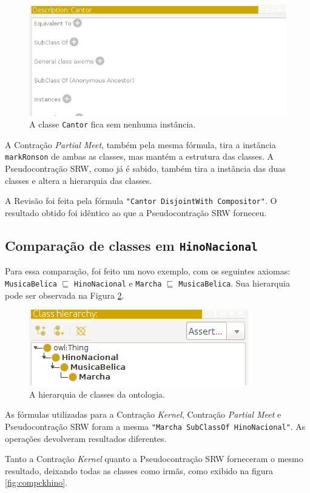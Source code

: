\begin{figure}[H]
	\centering
	\includegraphics[width=0.5\linewidth]{Capitulos/Testes/compckcantor3}
	\caption{A classe \texttt{Cantor} fica sem nenhuma instância.}
	\label{fig:compckcantor3}
\end{figure}

A Contração \textit{Partial Meet}, também pela mesma fórmula, tira a instância \texttt{markRonson} de ambas as classes, mas mantém a estrutura das classes. A Pseudocontração SRW, como já é sabido, também tira a instância das duas classes e altera a hierarquia das classes.

A Revisão foi feita pela fórmula \texttt{"Cantor DisjointWith Compositor"}. O resultado obtido foi idêntico ao que a Pseudocontração SRW forneceu. 

\subsection{Comparação de classes em \texttt{HinoNacional}}

Para essa comparação, foi feito um novo exemplo, com os seguintes axiomas: \texttt{MusicaBelica} $ \sqsubseteq $ \texttt{HinoNacional} e \texttt{Marcha} $ \sqsubseteq $ \texttt{MusicaBelica}. Sua hierarquia pode ser observada na Figura \ref{fig:comphino}. 

\begin{figure}[H]
	\centering
	\includegraphics[width=0.5\linewidth]{Capitulos/Testes/comphino}
	\caption{A hierarquia de classes da ontologia.}
	\label{fig:comphino}
\end{figure}

As fórmulas utilizadas para a Contração \textit{Kernel}, Contração \textit{Partial Meet} e Pseudocontração SRW foram a mesma \texttt{"Marcha SubClassOf HinoNacional"}. As operações devolveram resultados diferentes.

Tanto a Contração \textit{Kernel} quanto a Pseudocontração SRW forneceram o mesmo resultado, deixando todas as classes como irmãs, como exibido na figura \ref{fig:compckhino}.

